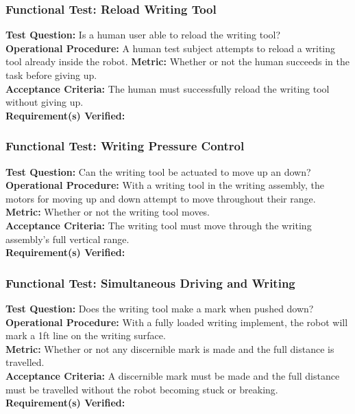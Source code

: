 \subsubsection{Functional Test: Reload Writing Tool}
\label{test:writing_ft_reload}
\textbf{Test Question:} Is a human user able to reload the writing tool? \\
\textbf{Operational Procedure:} A human test subject attempts to reload a writing tool already inside the robot.
\textbf{Metric:} Whether or not the human succeeds in the task before giving up.\\
\textbf{Acceptance Criteria:} The human must successfully reload the writing tool without giving up.  \\
\textbf{Requirement(s) Verified:}  

\subsubsection{Functional Test: Writing Pressure Control}
\label{test:writing_ft_pressure}
\textbf{Test Question:} Can the writing tool be actuated to move up an down?\\
\textbf{Operational Procedure:} With a writing tool in the writing assembly, the motors for moving up and down attempt to move throughout their range. \\
\textbf{Metric:} Whether or not the writing tool moves.\\
\textbf{Acceptance Criteria:} The writing tool must move through the writing assembly's full vertical range. \\
\textbf{Requirement(s) Verified:} 

\subsubsection{Functional Test: Simultaneous Driving and Writing}
\label{test:writing_ft_both}
\textbf{Test Question:} Does the writing tool make a mark when pushed down? \\
\textbf{Operational Procedure:} With a fully loaded writing implement, the robot will mark a 1ft line on the writing surface.\\
\textbf{Metric:} Whether or not any discernible mark is made and the full distance is travelled. \\
\textbf{Acceptance Criteria:} A discernible mark must be made and the full distance must be travelled without the robot becoming stuck or breaking.\\
\textbf{Requirement(s) Verified:} 

